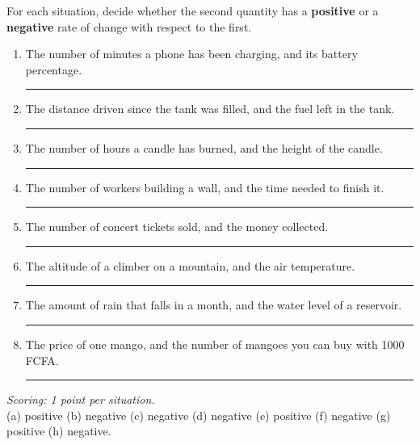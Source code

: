 

\begin{exo}{}
For each situation, decide whether the second quantity has a \textbf{positive} or a \textbf{negative} rate of change with respect to the first.
\begin{enumerate}[label=(\alph*),itemsep=2pt]
\item The number of minutes a phone has been charging, and its battery percentage. \ifkey\else\hfill\rule{2.2cm}{0.4pt}\fi
\item The distance driven since the tank was filled, and the fuel left in the tank. \ifkey\else\hfill\rule{2.2cm}{0.4pt}\fi
\item The number of hours a candle has burned, and the height of the candle. \ifkey\else\hfill\rule{2.2cm}{0.4pt}\fi
\item The number of workers building a wall, and the time needed to finish it. \ifkey\else\hfill\rule{2.2cm}{0.4pt}\fi
\item The number of concert tickets sold, and the money collected. \ifkey\else\hfill\rule{2.2cm}{0.4pt}\fi
\item The altitude of a climber on a mountain, and the air temperature. \ifkey\else\hfill\rule{2.2cm}{0.4pt}\fi
\item The amount of rain that falls in a month, and the water level of a reservoir. \ifkey\else\hfill\rule{2.2cm}{0.4pt}\fi
\item The price of one mango, and the number of mangoes you can buy with 1000 FCFA. \ifkey\else\hfill\rule{2.2cm}{0.4pt}\fi
\end{enumerate}
\begin{solution}
\textit{Scoring: 1 point per situation.}\\
(a) positive \quad (b) negative \quad (c) negative \quad (d) negative \quad (e) positive \quad (f) negative \quad (g) positive \quad (h) negative.
\end{solution}
\end{exo}


